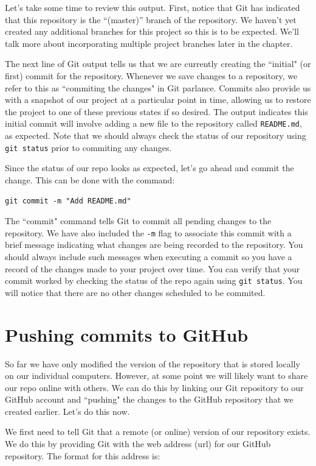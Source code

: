 \documentclass{book}
\begin{document}
Let's take some time to review this output. First, notice that Git has indicated that this repository is the ``(master)'' branch of the repository. We haven't yet created any additional branches for this project so this is to be expected. We'll talk more about incorporating multiple project branches later in the chapter.

The next line of Git output tells us that we are currently creating the ``initial" (or first)  commit for the repository. Whenever we save changes to a repository, we refer to this as ``commiting the changes" in Git parlance. Commits also provide us with a snapshot of our project at a particular point in time, allowing us to restore the project to one of these previous states if so desired. The output indicates this initial commit will involve adding a new file to the repository called \texttt{README.md}, as expected. Note that we should always check the status of our repository using \texttt{git status} prior to commiting any changes.

Since the status of our repo looks as expected, let's go ahead and commit the change. This can be done with the command:

\texttt{git commit -m "Add README.md"}

The ``commit" command tells Git to commit all pending changes to the repository. We have also included the \texttt{-m} flag to associate this commit with a brief message indicating what changes are being recorded to the repository. You should always include such messages when executing a commit so you have a record of the changes made to your project over time. You can verify that your commit worked by checking the status of the repo again using \texttt{git status}. You will notice that there are no other changes scheduled to be commited.

\section{Pushing commits to GitHub}
So far we have only modified the version of the repository that is stored locally on our individual computers. However, at some point we will likely want to share our repo online with others. We can do this by linking our Git repository to our GitHub account and ``pushing" the changes to the GitHub repository that we created earlier. Let's do this now.

We first need to tell Git that a remote (or online) version of our repository exists. We do this by providing Git with the web address (url) for our GitHub repository. The format for this address is:
\end{document}

